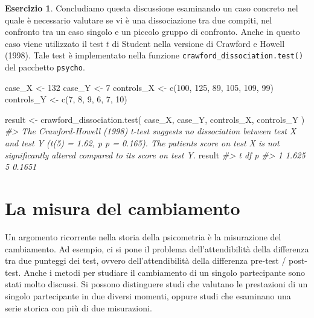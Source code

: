 \documentclass[
  11pt,
]{krantz}
\makeatletter
\newenvironment{Shaded}{\begin{snugshade}}{\end{snugshade}}
\newcommand{\CommentTok}[1]{\textcolor[rgb]{0.37,0.37,0.37}{\textit{#1}}}
\newcommand{\DecValTok}[1]{\textcolor[rgb]{0.06,0.06,0.06}{#1}}
\newcommand{\FunctionTok}[1]{\textcolor[rgb]{0,0,0}{#1}}
\newcommand{\NormalTok}[1]{#1}
\newcommand{\OtherTok}[1]{\textcolor[rgb]{0.37,0.37,0.37}{#1}}
\newenvironment{kframe}{%
\medskip{}
\setlength{\fboxsep}{.8em}
 \def\at@end@of@kframe{}%
 \ifinner\ifhmode%
  \def\at@end@of@kframe{\end{minipage}}%
  \begin{minipage}{\columnwidth}%
 \fi\fi%
 \def\FrameCommand##1{\hskip\@totalleftmargin \hskip-\fboxsep
 \colorbox{shadecolor}{##1}\hskip-\fboxsep
     \hskip-\linewidth \hskip-\@totalleftmargin \hskip\columnwidth}%
 \MakeFramed {\advance\hsize-\width
   \@totalleftmargin\z@ \linewidth\hsize
   \@setminipage}}%
 {\par\unskip\endMakeFramed%
 \at@end@of@kframe}
\renewenvironment{Shaded}{\begin{kframe}}{\end{kframe}}
\theoremstyle{definition}
\theoremstyle{definition}
\theoremstyle{definition}
\newtheorem{exercise}{Esercizio}[chapter]
\theoremstyle{definition}
\theoremstyle{remark}
\makeatother
\begin{document}
\begin{exercise}

Concludiamo questa discussione esaminando un caso concreto nel quale è necessario valutare se vi è una dissociazione tra due compiti, nel confronto tra un caso singolo e un piccolo gruppo di confronto. Anche in questo caso viene utilizzato il test \(t\) di Student nella versione di Crawford e Howell (1998). Tale test è implementato nella funzione \texttt{crawford\_dissociation.test()} del pacchetto \texttt{psycho}.

\begin{Shaded}
\begin{Highlighting}[]
\NormalTok{case\_X }\OtherTok{\textless{}{-}} \DecValTok{132}
\NormalTok{case\_Y }\OtherTok{\textless{}{-}} \DecValTok{7}
\NormalTok{controls\_X }\OtherTok{\textless{}{-}} \FunctionTok{c}\NormalTok{(}\DecValTok{100}\NormalTok{, }\DecValTok{125}\NormalTok{, }\DecValTok{89}\NormalTok{, }\DecValTok{105}\NormalTok{, }\DecValTok{109}\NormalTok{, }\DecValTok{99}\NormalTok{)}
\NormalTok{controls\_Y }\OtherTok{\textless{}{-}} \FunctionTok{c}\NormalTok{(}\DecValTok{7}\NormalTok{, }\DecValTok{8}\NormalTok{, }\DecValTok{9}\NormalTok{, }\DecValTok{6}\NormalTok{, }\DecValTok{7}\NormalTok{, }\DecValTok{10}\NormalTok{)}

\NormalTok{result }\OtherTok{\textless{}{-}} \FunctionTok{crawford\_dissociation.test}\NormalTok{(}
\NormalTok{  case\_X, case\_Y, controls\_X, controls\_Y}
\NormalTok{)}
\CommentTok{\#\textgreater{} The Crawford{-}Howell (1998) t{-}test suggests no dissociation between test X and test Y (t(5) = 1.62, p p = 0.165). The patient\textquotesingle{}s score on test X is not significantly altered compared to its score on test Y.}
\NormalTok{result}
\CommentTok{\#\textgreater{}       t df      p}
\CommentTok{\#\textgreater{} 1 1.625  5 0.1651}
\end{Highlighting}
\end{Shaded}

\end{exercise}

\hypertarget{la-misura-del-cambiamento}{%
\section{La misura del cambiamento}\label{la-misura-del-cambiamento}}

Un argomento ricorrente nella storia della psicometria è la misurazione del cambiamento. Ad esempio, ci si pone il problema dell'attendibilità della differenza tra due punteggi dei test, ovvero dell'attendibilità della differenza pre-test / post-test. Anche i metodi per studiare il cambiamento di un singolo partecipante sono stati molto discussi. Si possono distinguere studi che valutano le prestazioni di un singolo partecipante in due diversi momenti, oppure studi che esaminano una serie storica con più di due misurazioni.
\end{document}
